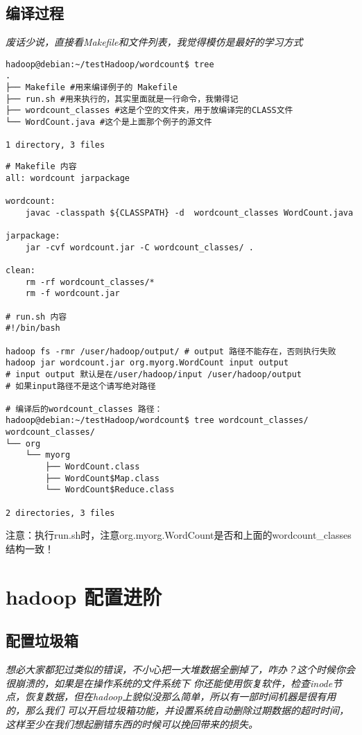\documentclass{article}
\begin{document}
\subsection{编译过程}
\textit{废话少说，直接看Makefile和文件列表，我觉得模仿是最好的学习方式}

\begin{verbatim}
hadoop@debian:~/testHadoop/wordcount$ tree 
.
├── Makefile #用来编译例子的 Makefile
├── run.sh #用来执行的，其实里面就是一行命令，我懒得记
├── wordcount_classes #这是个空的文件夹，用于放编译完的CLASS文件
└── WordCount.java #这个是上面那个例子的源文件

1 directory, 3 files
\end{verbatim}

\begin{verbatim}
# Makefile 内容
all: wordcount jarpackage

wordcount: 
	javac -classpath ${CLASSPATH} -d  wordcount_classes WordCount.java

jarpackage:
	jar -cvf wordcount.jar -C wordcount_classes/ . 

clean:
	rm -rf wordcount_classes/*
	rm -f wordcount.jar

# run.sh 内容
#!/bin/bash

hadoop fs -rmr /user/hadoop/output/ # output 路径不能存在，否则执行失败
hadoop jar wordcount.jar org.myorg.WordCount input output 
# input output 默认是在/user/hadoop/input /user/hadoop/output
# 如果input路径不是这个请写绝对路径

# 编译后的wordcount_classes 路径：
hadoop@debian:~/testHadoop/wordcount$ tree wordcount_classes/
wordcount_classes/
└── org
    └── myorg
        ├── WordCount.class
        ├── WordCount$Map.class
        └── WordCount$Reduce.class

2 directories, 3 files
\end{verbatim}

\textsf{注意：执行run.sh时，注意org.myorg.WordCount是否和上面的wordcount\_classes 结构一致！}

\section{hadoop 配置进阶}
\subsection{配置垃圾箱}
\textit{
想必大家都犯过类似的错误，不小心把一大堆数据全删掉了，咋办？这个时候你会很崩溃的，如果是在操作系统的文件系统下
你还能使用恢复软件，检查inode节点，恢复数据，但在hadoop上貌似没那么简单，所以有一部时间机器是很有用的，那么我们
可以开启垃圾箱功能，并设置系统自动删除过期数据的超时时间，这样至少在我们想起删错东西的时候可以挽回带来的损失。
}
\end{document}
